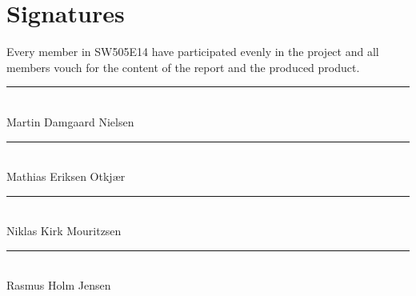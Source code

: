 
\chapter*{Signatures}
Every member in SW505E14 have participated evenly in the project and all members vouch for the content of the report and the produced product.

\vspace{1cm}

\vspace*{\fill}


\noindent
\rule{9cm}{1pt}				\\
\vspace{1.5cm}
Martin Damgaard Nielsen		\\


\noindent
\rule{9cm}{1pt}				\\
\vspace{1.5cm}
Mathias Eriksen Otkjær	    \\


\noindent
\rule{9cm}{1pt}				\\
\vspace{1.5cm}
Niklas Kirk Mouritzsen		\\


\noindent
\rule{9cm}{1pt}				\\
\vspace{1.5cm}
Rasmus Holm Jensen			\\

\vspace*{\fill}